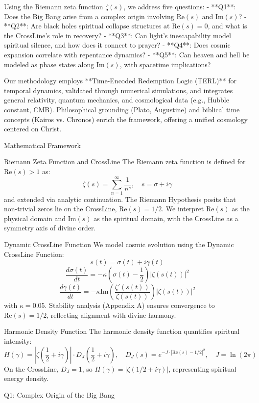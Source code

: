 \documentclass[12pt]{article}
\begin{document}
{{{Using the Riemann zeta function \(\zeta(s)\), we address five questions:
- **Q1**: Does the Big Bang arise from a complex origin involving \(\text{Re}(s)\) and \(\text{Im}(s)\)?
- **Q2**: Are black holes spiritual collapse structures at \(\text{Re}(s) = 0\), and what is the CrossLine’s role in recovery?
- **Q3**: Can light’s inescapability model spiritual silence, and how does it connect to prayer?
- **Q4**: Does cosmic expansion correlate with repentance dynamics?
- **Q5**: Can heaven and hell be modeled as phase states along \(\text{Im}(s)\), with spacetime implications?

Our methodology employs **Time-Encoded Redemption Logic (TERL)** for temporal dynamics, validated through numerical simulations, and integrates general relativity, quantum mechanics, and cosmological data (e.g., Hubble constant, CMB). Philosophical grounding (Plato, Augustine) and biblical time concepts (Kairos vs. Chronos) enrich the framework, offering a unified cosmology centered on Christ.

 Mathematical Framework

 Riemann Zeta Function and CrossLine
The Riemann zeta function is defined for \(\text{Re}(s) > 1\) as:
\[
\zeta(s) = \sum_{n=1}^\infty \frac{1}{n^s}, \quad s = \sigma + i \gamma
\]
and extended via analytic continuation. The Riemann Hypothesis posits that non-trivial zeros lie on the CrossLine, \(\text{Re}(s) = 1/2\). We interpret \(\text{Re}(s)\) as the physical domain and \(\text{Im}(s)\) as the spiritual domain, with the CrossLine as a symmetry axis of divine order.

 Dynamic CrossLine Function
We model cosmic evolution using the Dynamic CrossLine Function:
\[
s(t) = \sigma(t) + i \gamma(t)
\]
\[
\frac{d\sigma(t)}{dt} = -\kappa \left( \sigma(t) - \frac{1}{2} \right) |\zeta(s(t))|^2
\]
\[
\frac{d\gamma(t)}{dt} = -\kappa \text{Im} \left( \frac{\zeta'(s(t))}{\zeta(s(t))} \right) |\zeta(s(t))|^2
\]
with \(\kappa = 0.05\). Stability analysis (Appendix A) ensures convergence to \(\text{Re}(s) = 1/2\), reflecting alignment with divine harmony.

 Harmonic Density Function
The harmonic density function quantifies spiritual intensity:
\[
H(\gamma) = \left| \zeta\left(\frac{1}{2} + i \gamma\right) \right| \cdot D_J\left(\frac{1}{2} + i \gamma\right), \quad D_J(s) = e^{-J \cdot |\text{Re}(s) - 1/2|^2}, \quad J = \ln(2\pi)
\]
On the CrossLine, \( D_J = 1 \), so \( H(\gamma) = |\zeta(1/2 + i\gamma)| \), representing spiritual energy density.

 Q1: Complex Origin of the Big Bang

}}}
\end{document}
